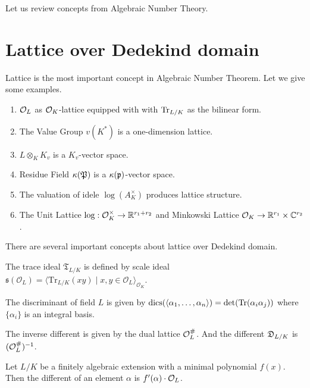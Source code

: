 {Let us review concepts from  Algebraic Number Theory.

\section*{Lattice over Dedekind domain}

Lattice is the most important concept in Algebraic Number Theorem. Let we give some examples.
\begin{enumerate}
    \item $\ol$ as $\ok$-lattice equipped with with $\tr_{L/K}$ as the bilinear form.
    \item The Value Group $v(K^*)$ is a one-dimension lattice.
    \item $L\otimes_K K_v$ is a $K_v$-vector space.
    \item Residue Field $\kappa(\P)$ is a $\kappa(\p)$-vector space.
    \item The valuation of idele $\log(A_K^{\times})$ produces lattice structure.
    \item The Unit Lattice $\log:\ok^\times\to \R^{r_1+r_2}$ and Minkowski Lattice $\ok\to \R^{r_1}\times \C^{r_2}$.
\end{enumerate}

There are several important concepts about lattice over Dedekind domain.
\begin{definition}
    The trace ideal $\mathfrak{T}_{L/K}$ is defined by scale ideal $\mathfrak{s}(\mathcal{O}_L) = \langle \text{Tr}_{L/K}(xy) \mid x,y \in \mathcal{O}_L \rangle_{\mathcal{O}_K}$.
\end{definition}

\begin{definition}
    The discriminant of field $L$ is given by $\dics(\langle\alpha_1,\dots,\alpha_n \rangle) = \det(\tr(\alpha_i\alpha_j))$ where $\{\alpha_i\}$ is an integral basis.
\end{definition}

\begin{definition}
    The inverse different is given by the dual lattice $\ol^{\#}$. And the different $\D_{L/K}$ is $(\ol^{\#})^{-1}$.
\end{definition}

\begin{definition}
    Let $L/K$ be a finitely algebraic extension with a minimal polynomial $f(x)$. Then the different of an element $\alpha$ is $f'(\alpha)\cdot \ol$.
\end{definition}

}

